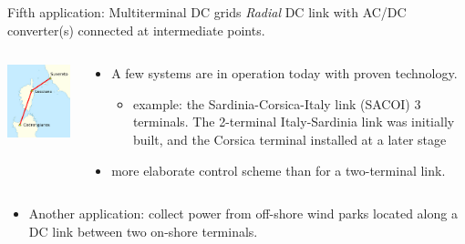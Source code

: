 \begin{frame}[allowframebreaks]{Fifth application: Multiterminal DC grids}
\textit{Radial} DC link with AC/DC converter(s) connected at intermediate points.
\begin{columns}
\begin{column}{0.5\linewidth}
\begin{center}
    \includegraphics[width=0.6\linewidth]{images/mtdc2.png}
\end{center}
\end{column}
\begin{column}{0.5\linewidth}
\begin{itemize}
    \item A few systems are in operation today with proven technology.
    \begin{itemize}
        \item example: the Sardinia-Corsica-Italy link (SACOI)
3 terminals. The 2-terminal Italy-Sardinia link was initially built, and the Corsica terminal installed at a later stage
    \end{itemize}
    \item more elaborate control scheme than for a two-terminal link.
\end{itemize}
\end{column}
\end{columns}
\begin{columns}
\begin{column}{0.5\linewidth}
\begin{itemize}
    \item Another application: collect power from off-shore wind parks located along a DC link between two on-shore terminals.

\end{itemize}
\end{column}
\end{columns}
\end{frame}
